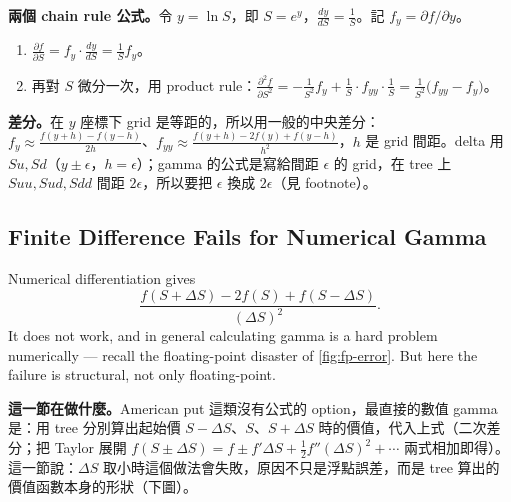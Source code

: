\suppstart
{}

\begin{remark}[補充]
	\textbf{兩個 chain rule 公式。}令 $y=\ln S$，即 $S=e^{y}$，$\frac{dy}{dS}=\frac1S$。記 $f_{y}=\partial f/\partial y$。
	\begin{enumerate}[(1),nosep]
		\item $\frac{\partial f}{\partial S}=f_{y}\cdot\frac{dy}{dS}=\frac1S f_{y}$。
		\item 再對 $S$ 微分一次，用 product rule：$\frac{\partial^{2}f}{\partial S^{2}}=-\frac{1}{S^{2}}f_{y}+\frac1S\cdot f_{yy}\cdot\frac1S=\frac{1}{S^{2}}\bigl(f_{yy}-f_{y}\bigr)$。
	\end{enumerate}
	\textbf{差分。}在 $y$ 座標下 grid 是等距的，所以用一般的中央差分：$f_{y}\approx\frac{f(y+h)-f(y-h)}{2h}$、$f_{yy}\approx\frac{f(y+h)-2f(y)+f(y-h)}{h^{2}}$，$h$ 是 grid 間距。delta 用 $Su,Sd$（$y\pm\epsilon$，$h=\epsilon$）；gamma 的公式是寫給間距 $\epsilon$ 的 grid，在 tree 上 $Suu,Sud,Sdd$ 間距 $2\epsilon$，所以要把 $\epsilon$ 換成 $2\epsilon$（見 footnote）。
\end{remark}
\suppend

\subsection{Finite Difference Fails for Numerical Gamma}
\label{sec:numerical-gamma-fails}


Numerical differentiation gives
\[
	\frac{f(S+\Delta S)-2f(S)+f(S-\Delta S)}{(\Delta S)^{2}} .
\]
It does not work, and in general calculating gamma is a hard problem numerically --- recall the floating-point disaster of \autoref{fig:fp-error}.
\suppstart
But here the failure is structural, not only floating-point.

\begin{remark}
	\textbf{這一節在做什麼。}American put 這類沒有公式的 option，最直接的數值 gamma 是：用 tree 分別算出起始價 $S-\Delta S$、$S$、$S+\Delta S$ 時的價值，代入上式（二次差分；把 Taylor 展開 $f(S\pm\Delta S)=f\pm f'\Delta S+\frac12f''(\Delta S)^{2}+\cdots$ 兩式相加即得）。這一節說：$\Delta S$ 取小時這個做法會失敗，原因不只是浮點誤差，而是 tree 算出的價值函數本身的形狀（下圖）。
\end{remark}

